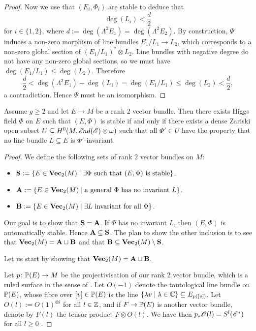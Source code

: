 \documentclass[A4paper, 12pt, british, reqno]{amsart}
\newcommand{\ot}{\otimes}
\newcommand{\dual}{^{*}}
\begin{document}
\begin{prop}
\begin{proof}
	Now we use that $(E_{i},\Phi_{i})$ are stable to deduce that
	\[ \deg(L_{i})<\frac{d}{2} \]
	for $i\in \{1,2\}$, where $d:=\deg(\Lambda^{2}E_{1})=\deg(\Lambda^{2}E_{2})$.
	By construction, $\Psi$ induces a non-zero morphism of line bundles $E_{1}/L_{1}\to L_{2}$, which corresponds to a non-zero global section of $(E_{1}/L_{1})\dual\ot L_{2}$.
	Line bundles with negative degree do not have any non-zero global sections, so we must have $\deg(E_{1}/L_{1})\leqslant \deg(L_{2})$.
	Therefore
	\[ \frac{d}{2}<\deg(\Lambda^{2}E_{1})-\deg(L_{1})=\deg(E_{1}/L_{1})\leqslant \deg(L_{2})<\frac{d}{2}, \]
	a contradiction.
	Hence $\Psi$ must be an isomorphism.
    \end{proof}
\end{prop}

\begin{prop}
    Assume $g\geqslant 2$ and let $E\to M$ be a rank $2$ vector bundle.
    Then there exists Higgs field $\Phi$ on $E$ such that $(E,\Phi)$ is stable if and only if there exists a dense Zariski open subset $U\subseteq H^{0}(M,\sEnd(\E)\ot \w)$ such that all $\Phi'\in U$ have the property that no line bundle $L\subseteq E$ is $\Phi'$-invariant.
    \begin{proof}
	We define the following sets of rank $2$ vector bundles on $M$:
	\begin{itemize}
	    \item $\bfS:=\{ E\in \Vec_{2}(M)\mid \exists \Phi \text{ such that }(E,\Phi)\text{ is stable}\}$.
	    \item $\bfA:=\{ E\in \Vec_{2}(M)\mid \text{a general }\Phi\text{ has no invariant }L \}$.
	    \item $\bfB:=\{ E\in \Vec_{2}(M)\mid \exists L\text{ invariant for all }\Phi\}$.
	\end{itemize}

	Our goal is to show that $\bfS=\bfA$.
	If $\Phi$ has no invariant $L$, then $(E,\Phi)$ is automatically stable.
	Hence $\bfA\subseteq \bfS$.
	The plan to show the other inclusion is to see that $\Vec_{2}(M)=\bfA\sqcup \bfB$ and that $\bfB\subseteq \Vec_{2}(M)\setminus \bfS$.
	
	Let us start by showing that $\Vec_{2}(M)=\bfA\sqcup \bfB$.

	Let $p\colon \P(E)\to M$ be the projectivisation of our rank 2 vector bundle, which is a ruled surface in the sense of \cite[\S V.2]{har77}.
	Let $O(-1)$ denote the tautological line bundle on $\P(E)$, whose fibre over $[v]\in \P(E)$ is the line $\{\lambda v \mid \lambda\in \C\}\subseteq E_{p([v])}$.
	Let $O(l):=O(1)^{\ot l}$ for all $l\in \Z$, and if $F\to \P(E)$ is another vector bundle, denote by $F(l)$ the tensor product $F\ot O(l)$.
	We have then $p_{*}\O(l)=S^{l}(\E\dual)$ for all $l\geqslant 0$ \cite[Exercise III.8.4]{har77}.


\end{proof}
\end{prop}
\end{document}
